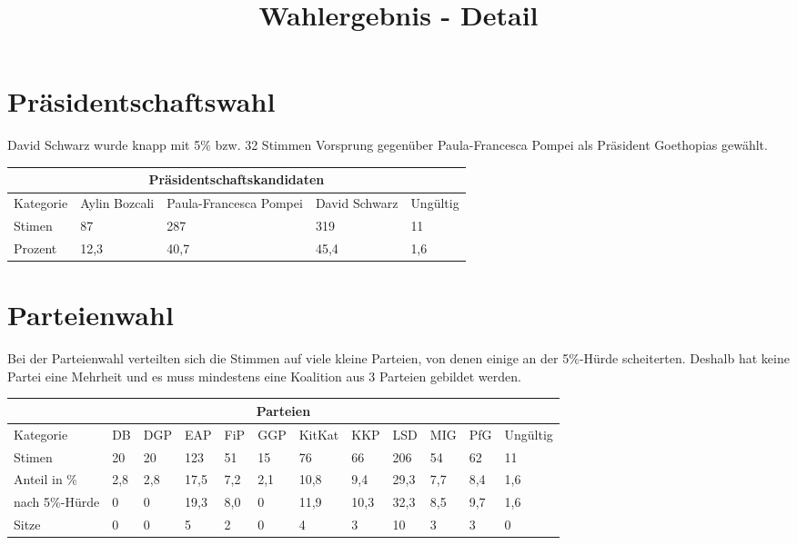 \documentclass{sasbase}
\begin{document}
\onecolumn
\title{Wahlergebnis - Detail}

\mytitle

\setlength{\parindent}{0mm}
\setlength{\parskip}{2mm}
\renewcommand{\arraystretch}{1.3}

\section{Präsidentschaftswahl}

David Schwarz wurde knapp mit 5\% bzw. 32 Stimmen Vorsprung gegenüber Paula-Francesca Pompei als Präsident Goethopias gewählt.

\begin{center}
    \begin{tabular}{ |p{3cm}||p{3cm}|p{3cm}|p{3cm}|p{3cm}|  }
     \hline
     \multicolumn{5}{|c|}{Präsidentschaftskandidaten} \\
     \hline
     Kategorie & Aylin Bozcali  & Paula-Francesca Pompei & David Schwarz & Ungültig\\
     \hline
     Stimen   & 87    & 287 &   319 & 11 \\
     Prozent &  12,3  & 40,7   & 45,4 & 1,6 \\
     \hline
    \end{tabular}
\end{center}


\section{Parteienwahl}

Bei der Parteienwahl verteilten sich die Stimmen auf viele kleine Parteien, von denen
einige an der 5\%-Hürde scheiterten. Deshalb hat keine Partei eine Mehrheit und es muss
mindestens eine Koalition aus 3 Parteien gebildet werden.

\vspace{5mm}
\begin{tabular}{ |p{3cm}||p{1cm}|p{1cm}|p{1cm}|p{1cm}|p{1cm}|p{1cm}|p{1cm}|p{1cm}|p{1cm}|p{1cm}|p{1.2cm}|  }
     \hline
     \multicolumn{12}{|c|}{Parteien} \\
     \hline
     Kategorie & DB & DGP & EAP & FiP & GGP & KitKat & KKP & LSD & MIG & PfG & Ungültig\\
     \hline
     Stimen   & 20 & 20  & 123 & 51 & 15 & 76 & 66 & 206 & 54 & 62 & 11 \\
     Anteil in \%  & 2,8 & 2,8  & 17,5 & 7,2 & 2,1 & 10,8 & 9,4 & 29,3 & 7,7 & 8,4 & 1,6 \\
    nach 5\%-Hürde  & 0 & 0 & 19,3  & 8,0 & 0 & 11,9 & 10,3 & 32,3 & 8,5 & 9,7 & 1,6 \\
     \hline
      \hline
     Sitze & 0 & 0 & 5 & 2 & 0 & 4 & 3 & 10 & 3 & 3 & 0\\
     \hline
\end{tabular}
\end{document}
